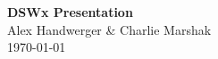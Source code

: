 \documentclass[8pt]{beamer}
\begin{document}
\begin{frame}
\begin{center}
\textbf{DSWx Presentation}\\
\vspace{.5cm}
Alex Handwerger \& Charlie Marshak \\

\today\\
\end{center}
\end{frame}




\end{document}
